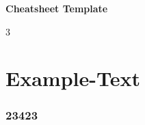 \raggedright
\footnotesize

\begin{center}
    \Large{\textbf{Cheatsheet Template}}

\end{center}

\begin{multicols*}{3}

    \section*{Example-Text}\label{sec:example-text}


    \subsubsection*{23423}



\end{multicols*}

\newpage
